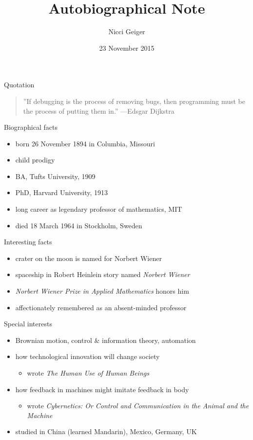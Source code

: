 \documentclass{beamer}
\title{Autobiographical Note}
\author{Nicci Geiger}
\institute{Cornell College}
\date{23 November 2015}
\begin{document}
\begin{frame}
  \titlepage
\end{frame}

\begin{frame}{Quotation}
\begin{quotation}
\noindent
''If debugging is the process of removing bugs, then programming must be the process of putting them in.''
  \flushright
  ---Edsgar Dijkstra
  \end{quotation}
\end{frame}

\begin{frame}{Biographical facts}
\begin{itemize}
  \item born 26 November 1894 in Columbia, Missouri
  \item child prodigy
  \item BA, Tufts University, 1909
  \item PhD, Harvard University, 1913
  \item long career as legendary professor of mathematics, MIT
  \item died 18 March 1964 in Stockholm, Sweden
  \end{itemize}
\end{frame}

\begin{frame}{Interesting facts}
\begin{itemize}
  \item crater on the moon is named for Norbert Wiener
  \item spaceship in Robert Heinlein story
    named \emph{Norbert Wiener}
  \item \emph{Norbert Wiener Prize in Applied Mathematics} honors him
  \item affectionately remembered as an absent-minded professor
  \end{itemize}
\end{frame}

\begin{frame}{Special interests}
\begin{itemize}
  \item Brownian motion, control \& information theory,
    automation
  \item how technological innovation will
    change society 
  \begin{itemize}
    \item wrote \emph{The Human Use of Human Beings}
    \end{itemize}
  \item how feedback in machines might imitate feedback in body
  \begin{itemize}
    \item wrote \emph{Cybernetics: Or Control
      and Communication in the Animal and the Machine}
    \end{itemize}
  \item studied in China (learned Mandarin), Mexico, Germany, UK
  \end{itemize}
\end{frame}
\end{document}
